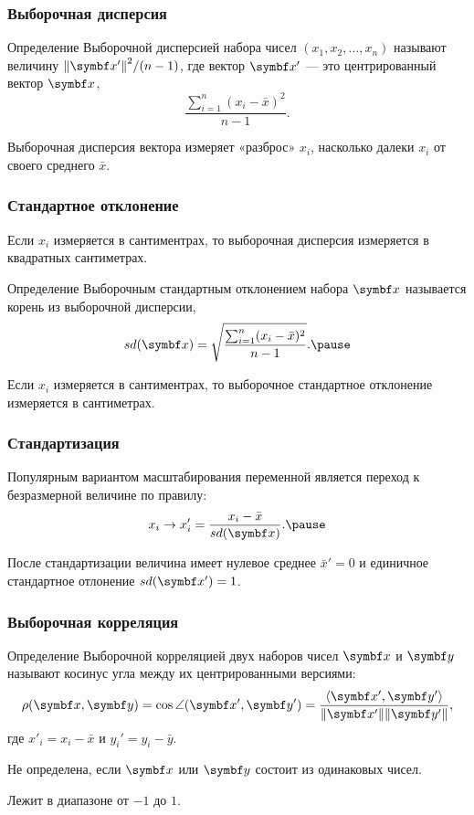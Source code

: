 \begin{frame}
  \frametitle{Выборочная дисперсия}

  \begin{block}{Определение}
    \alert{Выборочной дисперсией} набора чисел $(x_1, x_2, \ldots, x_n)$ 
    называют величину $\norm{\bx'}^2 / (n-1)$, где вектор $\bx'$ — это 
    центрированный вектор $\bx$, 
    \[
    \frac{\sum_{i=1}^n(x_i - \bar x)^2}{n-1}.  
    \]
    \pause
  \end{block}

  Выборочная дисперсия вектора измеряет «разброс» $x_i$, 
  насколько далеки $x_i$ от своего среднего $\bar x$.
  

\end{frame}


\begin{frame}
  \frametitle{Стандартное отклонение}

  Если $x_i$ измеряется в сантиментрах, 
  то выборочная дисперсия измеряется в квадратных сантиметрах. \pause

  \begin{block}{Определение}
    \alert{Выборочным стандартным отклонением} набора $\bx$ называется 
    корень из выборочной дисперсии, 
    \[
      sd(\bx) = \sqrt{\frac{\sum_{i=1}^n(x_i - \bar x)^2}{n-1}}. \pause
    \]
  \end{block}

  \pause 
  Если $x_i$ измеряется в сантиментрах, 
  то выборочное стандартное отклонение измеряется в  сантиметрах. 
  

\end{frame}

\begin{frame}
  \frametitle{Стандартизация}

  Популярным вариантом масштабирования переменной является переход к безразмерной 
  величине по правилу:
  \[
  x_i  \to x_i' =  \frac{x_i - \bar x}{sd(\bx)}.  \pause
  \]

  После стандартизации величина имеет нулевое среднее $\bar x' =0$ и 
  единичное стандартное отлонение $sd(\bx') = 1$.


\end{frame}


\begin{frame}
  \frametitle{Выборочная корреляция}

  \begin{block}{Определение}
    \alert{Выборочной корреляцией} двух наборов чисел $\bx$ и $\by$
    называют косинус угла между их центрированными версиями:
    \[
    \rho(\bx, \by) = \cos \angle (\bx', \by') = \frac{\langle \bx', \by' \rangle}{\norm{\bx'} \norm{\by'}},   
    \]
    где $x'_i = x_i - \bar x$ и $y_i' = y_i - \bar y$. \pause
  \end{block}

Не определена, если $\bx$ или $\by$ состоит из одинаковых чисел. \pause
 
Лежит в диапазоне от $-1$ до $1$. 

\end{frame}


